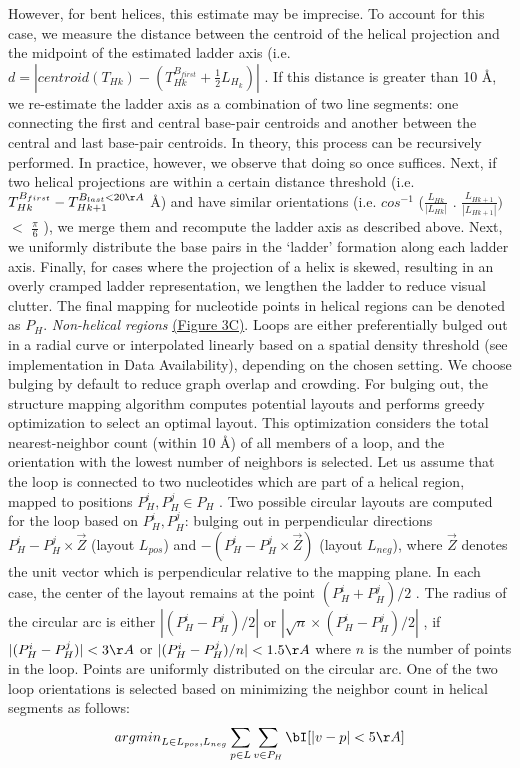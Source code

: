 However, for bent helices, this estimate may be imprecise. To account for this case, we measure the distance
 between the centroid of the helical projection and the midpoint of the estimated ladder axis (i.e. $d = |centroid(T_{Hk}) - (T_{Hk}^{B_{first}} + \frac{1}{2}L_{H_k})|$
. If this distance is greater than 10 \AA, we re-estimate the ladder axis as a combination of two line segments: one connecting the first and central base-pair centroids and another between the central and last base-pair centroids. In theory, this process can be recursively performed. In practice, however, we observe that doing so once suffices. Next, if two helical projections are within a certain distance threshold (i.e. $T_{Hk}^{B_{first}} - T_{Hk+1}^{B_{last} < 20 \AA}$
Å) and have similar orientations (i.e. 
$cos^{-1}$ 
($\frac{L_{Hk}}{|L_{Hk}|}$ 
$.$ 
$\frac{L_{H{k+1}}}{|L_{H{k+1}}|})$ 
$<$ 
$\frac{\pi}{6}$
), we merge them and recompute the ladder axis as described above. Next, we uniformly distribute the base pairs in the ‘ladder’ formation along each ladder axis. Finally, for cases where the projection of a helix is skewed, resulting in an overly cramped ladder representation, we lengthen the ladder to reduce visual clutter. The final mapping for nucleotide points in helical regions can be denoted as $P_H$.
\textit{Non-helical regions} \hyperref[fig:rnascape3]{(Figure 3C)}. Loops are either preferentially bulged out in a radial curve or interpolated linearly based on a spatial density threshold (see implementation in Data Availability), depending on the chosen setting. We choose bulging by default to reduce graph overlap and crowding. For bulging out, the structure mapping algorithm computes potential layouts and performs greedy optimization to select an optimal layout. This optimization considers the total nearest-neighbor count (within 10 \AA) of all members of a loop, and the orientation with the lowest number of neighbors is selected. Let us assume that the loop is connected to two nucleotides which are part of a helical region, mapped to positions $P_H^i, P_H^j \in P_H$ . Two possible circular layouts are computed for the loop based on $P_H^i, P_H^j$: bulging out in perpendicular directions $P_H^i - P_H^j\times \vec{Z}$
(layout $L_{pos}$) and $-(P_H^i - P_H^j\times \vec{Z})$ 
(layout $L_{neg}$), where $\vec{Z}$
denotes the unit vector which is perpendicular relative to the mapping plane. In each case, the center of the layout remains at the point $(P_H^i + P_H^j)/2$
. The radius of the circular arc is either $|(P_H^i - P_H^j)/2|$ or $|\sqrt{n}\times(P_H^i - P_H^j)/2|$
, if $|(P_H^i - P_H^j)| < 3 \AA$ or $|(P_H^i - P_H^j)/n| < 1.5 \AA$
where $n$ is the number of points in the loop. Points are uniformly distributed on the circular arc. One of the two loop orientations is selected based on minimizing the neighbor count in helical segments as follows:
\begin{align}
{argmin}_{L\in{L_{pos},L_{neg}}}\sum\limits_{p\in L}\sum\limits_{v\in P_H}\bI[|v-p| < 5 \AA]
\end{align}

